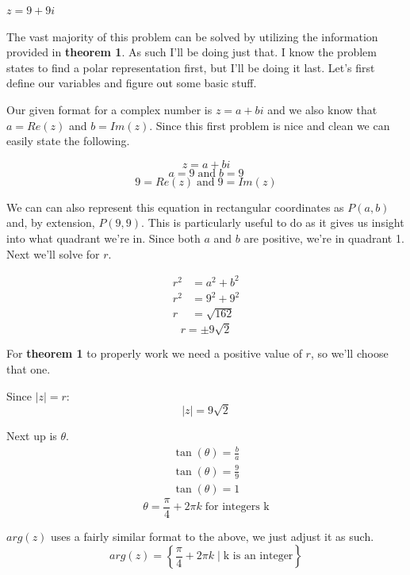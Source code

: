\begin{problem}[1.]
    $z = 9 + 9i$
\end{problem}

\begin{solution}
    The vast majority of this problem can be solved by utilizing the information provided in \textbf{theorem 1}. As such I'll be doing just that. I know the problem states to find a polar representation first, but I'll be doing it last. Let's first define our variables and figure out some basic stuff. \medskip
    
    Our given format for a complex number is $z = a + bi$ and we also know that $a = Re(z)$ and $b = Im(z)$. Since this first problem is nice and clean we can easily state the following. 
    
    \[z = a + bi\]
    \[a = 9 \; \text{and} \; b = 9\]
    \[ \boxed{9 = Re(z)} \; \text{and} \; \boxed{ 9 = Im(z) }\]
    
    We can can also represent this equation in rectangular coordinates as $P(a, b)$ and, by extension, $P(9, 9)$. This is particularly useful to do as it gives us insight into what quadrant we're in. Since both $a$ and $b$ are positive, we're in quadrant 1. Next we'll solve for $r$.
    
    \begin{align}
        r^2 &= a^2 + b^2 \\
        r^2 &= 9^2 + 9^2 \\
        r &= \sqrt{162}
    \end{align}
    \[\boxed{r = \pm 9\sqrt{2}}\]
    
    For \textbf{theorem 1} to properly work we need a positive value of $r$, so we'll choose that one.
    
    Since $|z| = r$:
    \[\boxed{|z| = 9\sqrt{2}}\]
    
    Next up is $\theta$.
    \begin{align}
        \tan(\theta) = \frac{b}{a} \\
        \tan(\theta) = \frac{9}{9} \\ 
        \tan(\theta) = 1
    \end{align}
    \[\boxed{ \theta = \frac{\pi}{4} + 2\pi k \; \text{for integers k} }\]
    
    $arg(z)$ uses a fairly similar format to the above, we just adjust it as such.
    \[\boxed{ arg(z) = \left\{ \frac{\pi}{4} + 2\pi k \; | \; \text{k is an integer} \right\} }\]
    
    \pagebreak 
    

\end{solution}
